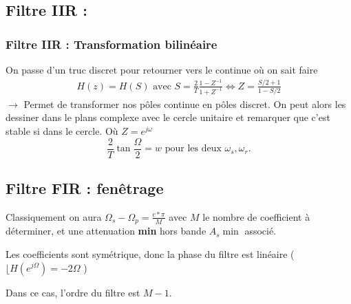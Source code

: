 \documentclass{article}
\theoremstyle{plain}%
\theoremstyle{definition}
\theoremstyle{remark}
\begin{document}
\subsection{Filtre IIR :}
\subsubsection{Filtre IIR : Transformation bilinéaire}
On passe d'un truc discret pour retourner vers le continue où on sait faire 
\begin{align*}    
    H(z) = H(S) \text{ avec } S = \frac{2}{T} \frac{1 - Z^{-1}}{1 + Z^{-1}}
    \Leftrightarrow Z = \frac{ S/2 + 1}{1 - S/2}
\end{align*}
$\rightarrow$ Permet de transformer nos pôles continue en pôles discret. On peut alors les dessiner dans le plans complexe avec le cercle unitaire et remarquer que c'est stable si dans le cercle.
    Où $ Z = e^{j \omega } $ 
\[
    \frac{2}{T} \tan \frac{\Omega }{2} = w \text{ pour les deux }\omega _s, \omega _r
.\]
        
\subsection{Filtre FIR : fenêtrage}
Classiquement on aura $ \Omega _s - \Omega _p = \frac{c*\pi }{M} $ avec $ M $ le nombre de coefficient à déterminer, et une attenuation \textbf{min} hors bande $ A_s \min  $ associé.

Les coefficients sont symétrique, donc la phase du filtre est linéaire ($ \lfloor H(e^{j \Omega }) = -2 \Omega $ )

Dans ce cas, l'ordre du filtre est $ M - 1 $.
\end{document}
